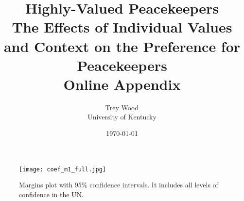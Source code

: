 \documentclass[12pt]{article}
\title{Highly-Valued Peacekeepers \\
\large The Effects of Individual Values and Context on the Preference for Peacekeepers \\
\textbf{Online Appendix}}
\author{Trey Wood \\
University of Kentucky}
\date{\today}
\renewcommand{\thesection}{\Roman{section}}
\begin{document}
\begin{titlingpage}
\maketitle
\end{titlingpage}


\appendix 

\renewcommand{\thesection}{Appendix \Alph{section}}
\setcounter{section}{0}

\renewcommand{\thetable}{\Alph{section}\arabic{table}}
\setcounter{table}{0}

\renewcommand{\thefigure}{\Alph{section}\arabic{figure}}
\setcounter{figure}{0}


\begin{centering}
\section{}
\end{centering}

\begin{centering}

\end{centering}

\clearpage

\begin{centering}
\section{}
\setcounter{table}{0}
\setcounter{figure}{0}
\end{centering}


\begin{centering}

\label{Table 4}
\end{centering}

\begin{centering}

\label{Table 5}
\end{centering}

\clearpage

\begin{centering}
\section{}
\setcounter{table}{0}
\setcounter{figure}{0}
\end{centering}


\begin{figure}[h!]
\begin{centering}
\texttt{[image: coef\_m1\_full.jpg]}
\caption{\small Margins plot with 95\% confidence intervals. It includes all levels of confidence in the UN.}
\label{figure 3}
\end{centering}
\end{figure}
\end{document}
